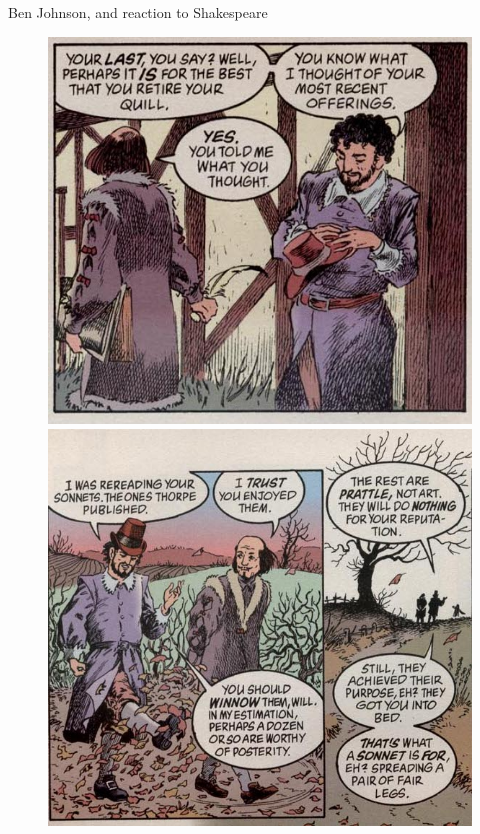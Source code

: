 \documentclass{beamer}
\begin{document}
  \begin{frame}{Ben Johnson, and reaction to Shakespeare}

      \begin{figure}[htp]
        \begin{center}
          \centering
          \includegraphics[scale=0.32]{../Presentation/ben.jpg}
          \includegraphics[scale=0.28]{../Presentation/ben2.jpg}
        \end{center}
      \end{figure}
      

\end{frame}
\end{document}
